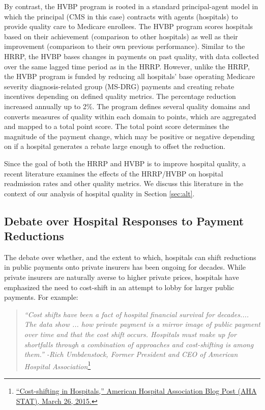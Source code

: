 \documentclass[12pt]{article}
\begin{document}
By contrast, the HVBP program is rooted in a standard principal-agent model in which the principal (CMS in this case) contracts with agents (hospitals) to provide quality care to Medicare enrollees. The HVBP program scores hospitals based on their achievement (comparison to other hospitals) as well as their improvement (comparison to their own previous performance).  Similar to the HRRP, the HVBP bases changes in payments on past quality, with data collected over the same lagged time period as in the HRRP. However, unlike the HRRP, the HVBP program is funded by reducing all hospitals' base operating Medicare severity diagnosis-related group (MS-DRG) payments and creating rebate incentives depending on defined quality metrics. The percentage reduction increased annually up to 2\%. The program defines several quality domains and converts measures of quality within each domain to points, which are aggregated and mapped to a total point score.  The total point score determines the magnitude of the payment change, which may be positive or negative depending on if a hospital generates a rebate large enough to offset the reduction.

Since the goal of both the HRRP and HVBP is to improve hospital quality, a recent literature examines the effects of the HRRP/HVBP on hospital readmission rates and other quality metrics. We discuss this literature in the context of our analysis of hospital quality in Section \ref{sec:alt}.

\subsection{Debate over Hospital Responses to Payment Reductions}
The debate over whether, and the extent to which, hospitals can shift reductions in public payments onto private insurers has been ongoing for decades. While private insurers are naturally averse to higher private prices, hospitals have emphasized the need to cost-shift in an attempt to lobby for larger public payments. For example:
\begin{quote}
\textit{``Cost shifts have been a fact of hospital financial survival for decades.... The data show ...  how private payment is a mirror image of public payment over time and that the cost shift occurs. Hospitals must make up for shortfalls through a combination of approaches and cost-shifting is among them.'' -Rich Umbdenstock, Former President and CEO of American Hospital Association}\footnote{\href{http://blog.aha.org/post/costshifting-in-hospitals-}{``Cost-shifting in Hospitals,'' American Hospital Association Blog Post (AHA STAT), March 26, 2015.}}
\end{quote}
\end{document}
